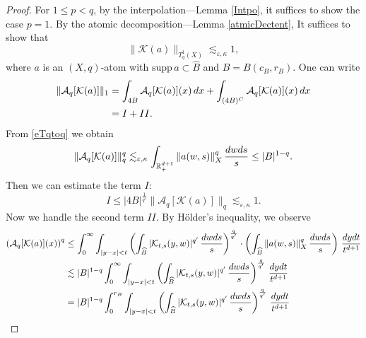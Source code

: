 \documentclass[oneside,english,a4wide]{amsart}
\numberwithin{equation}{section}
\numberwithin{figure}{section}
\theoremstyle{plain}
\theoremstyle{plain}
\theoremstyle{definition}
\theoremstyle{plain}
\theoremstyle{remark}
\theoremstyle{definition}
\theoremstyle{remark}
\theoremstyle{definition}
\newcommand{\real}{{\mathbb R}}
\newcommand{\A}{{\mathcal A}}
\newcommand{\e}{\varepsilon}
\newcommand{\8}{+\infty}
\renewcommand{\1}{\mathbbm{1}}
\newcommand{\wh}{\widehat}
\newcommand{\K}{{\mathcal K}}
\newcommand\sk[1]{ \left( #1 \right) }
\newcommand\supp{\text{supp}}
\renewcommand\d{{\rm d}}
\begin{document}
{\begin{proof}
For $1 \leq p < q$, by the interpolation---Lemma \ref{Intpo}, it suffices to show the case $p=1$. By the atomic decomposition---Lemma \ref{atmicDectent}, It suffices to show that 
    \begin{equation}\label{pi_La}
        \| \K(a) \|_{T^1_{q}(X)} \lesssim_{\e, \kappa} 1,
    \end{equation}
    where $a$ is an $(X,q)$-atom with $\supp\, a \subset \wh{B}$ and $B = B(c_B, r_B)$.
One can write
\[
\begin{aligned}
     \|  \A_q[\K(a)] \|_{1} & = \int_{4B} \A_q[\K(a)](x) \,\d x + \int_{(4B)^C} \A_q[\K(a)](x) \,\d x \\
     & = I + II.
\end{aligned}
\]
From \eqref{eTqtoq} we obtain
\begin{equation}\label{e3.13}
    \|  \A_q[\K(a)] \|_{q}^q \lesssim_{\e, \kappa} \int_{\real^{d+1}_+} \|a(w, s)\|_X^q \, \frac{\d w \d s}{s} \leq |B|^{1-q}.
\end{equation}
Then we can estimate the term $I$:
\begin{equation}\label{esI}
    I \leq |4B|^{\frac{1}{q'}}\|  \A_q[\K(a)] \|_{q} \lesssim_{\e, \kappa} 1.
\end{equation}
Now we handle the second term $II$.
By H\"{o}lder's inequality, we observe
\[
\begin{aligned}
    \sk{ \A_q[\K(a)](x) }^q& \leq \int_0^{\infty}\int_{|y - x| < t} \sk{ \int_{\wh{B}} |\K_{t, s}(y, w)|^{q'}\, \frac{\d w \d s}{s} }^{\frac{q}{q'}}\cdot\sk{ \int_{\wh{B}} \|a(w, s)\|_X^q \,\frac{\d w\d s}{s}} \, \frac{\d y \d t}{t^{d+1}} \\
    & \lesssim |B|^{1-q}\int_0^{\infty}\int_{|y - x| < t} \sk{ \int_{\wh{B}}|\K_{t, s}(y, w)|^{q'}\, \frac{\d w\d s}{s} }^{\frac{q}{q'}}\, \frac{\d y \d t}{t^{d+1}} \\
    & = |B|^{1-q}\int_0^{r_B}\int_{|y - x| < t} \sk{ \int_{\wh{B}} |\K_{t, s}(y, w)|^{q'}\, \frac{\d w\d s}{s} }^{\frac{q}{q'}}\, \frac{\d y \d t}{t^{d+1}} \\

\end{aligned}\]
\end{proof}}
\end{document}
